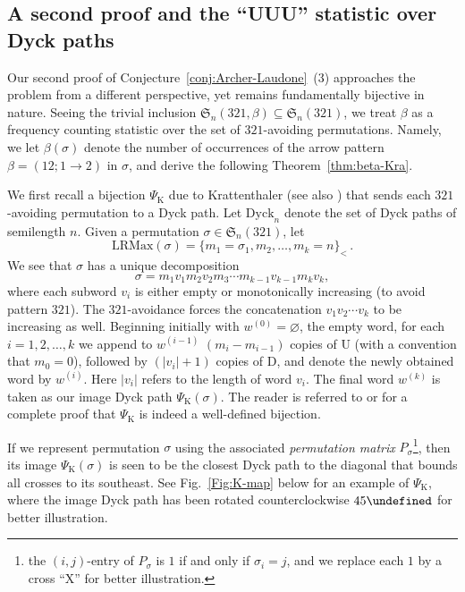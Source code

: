 \documentclass[12pt]{amsart}
\let\degree\undefined
\numberwithin{equation}{section}
\theoremstyle{plain}
\def\fS{\mathfrak{S}}
\def\rU{\mathrm{U}}
\def\rD{\mathrm{D}}
\def\PK{\Psi_{\mathrm{K}}}
\def\Dyck{\mathrm{Dyck}}
\def\LRMax{\mathrm{LRMax}}
\begin{document}
\subsection{A second proof and the ``UUU'' statistic over Dyck paths}
Our second proof of Conjecture~\ref{conj:Archer-Laudone}~(3) approaches the problem from a different perspective, yet remains fundamentally bijective in nature. Seeing the trivial inclusion $\fS_n(321,\beta)\subseteq\fS_n(321)$, we treat $\beta$ as a frequency counting statistic over the set of $321$-avoiding permutations. Namely, we let $\beta(\sigma)$ denote the number of occurrences of the arrow pattern $\beta=(12;1\to 2)$ in $\sigma$, and derive the following Theorem~\ref{thm:beta-Kra}. 

We first recall a bijection $\PK$ due to Krattenthaler \cite[Section 4]{Kra2001} (see also \cite[Chapter 1.5]{EC1}) that sends each $321$-avoiding permutation to a Dyck path. Let $\Dyck_n$ denote the set of Dyck paths of semilength $n$. Given a permutation $\sigma\in\fS_n(321)$, let 
$$\LRMax(\sigma)=\{m_1=\sigma_1,m_2,\ldots,m_k=n\}_{<}\, .$$  
We see that $\sigma$ has a unique decomposition
$$\sigma = m_1v_1m_2v_2m_3\cdots m_{k-1}v_{k-1}m_kv_k,$$
where each subword $v_i$ is either empty or monotonically increasing (to avoid pattern $321$). The $321$-avoidance forces the concatenation $v_1v_2\cdots v_k$ to be increasing as well. Beginning initially with $w^{(0)}=\varnothing$, the empty word, for each $i=1,2,\ldots,k$ we append to $w^{(i-1)}$ $(m_i-m_{i-1})$ copies of $\rU$ (with a convention that $m_0=0$), followed by $(|v_i|+1)$ copies of $\rD$, and denote the newly obtained word by $w^{(i)}$. Here $|v_i|$ refers to the length of word $v_i$. The final word $w^{(k)}$ is taken as our image Dyck path $\PK(\sigma)$. The reader is referred to \cite{Kra2001} or \cite{EC1} for a complete proof that $\PK$ is indeed a well-defined bijection. 

If we represent permutation $\sigma$ using the associated \emph{permutation matrix} $P_{\sigma}$\footnote{the $(i,j)$-entry of $P_{\sigma}$ is $1$ if and only if $\sigma_i=j$, and we replace each $1$ by a cross ``$\mathrm{X}$'' for better illustration.}, then its image $\PK(\sigma)$ is seen to be the closest Dyck path to the diagonal that bounds all crosses to its southeast. See Fig.~\ref{Fig:K-map} below for an example of $\PK$, where the image Dyck path has been rotated counterclockwise $45\degree$ for better illustration.
\end{document}
